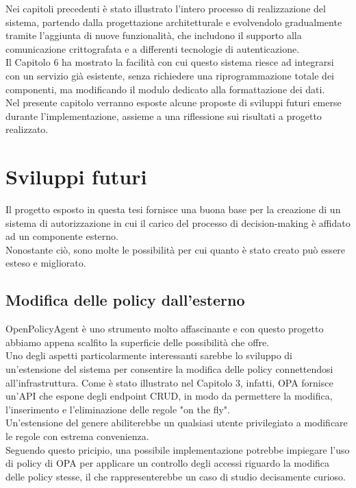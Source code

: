 Nei capitoli precedenti è stato illustrato l'intero processo di realizzazione del sistema, partendo dalla
progettazione architetturale e evolvendolo gradualmente tramite l'aggiunta di nuove funzionalità, che includono il supporto alla comunicazione crittografata 
e a differenti tecnologie di autenticazione. 
\\ Il Capitolo 6 ha mostrato la facilità 
con cui questo sistema riesce ad integrarsi con un servizio già esistente, senza richiedere una 
riprogrammazione totale dei componenti, ma modificando il modulo dedicato alla formattazione dei dati. 
\\ Nel presente capitolo verranno esposte alcune proposte di sviluppi futuri emerse durante l'implementazione, assieme a una riflessione
 sui risultati a progetto realizzato. 

\section{Sviluppi futuri}
Il progetto esposto in questa tesi fornisce una buona base per la creazione di un sistema di autorizzazione 
in cui il carico del processo di decision-making è affidato ad un componente esterno.  
\\ Nonostante ciò, sono molte le possibilità per cui quanto è stato creato può essere esteso e migliorato. 

\subsection{Modifica delle policy dall'esterno}
OpenPolicyAgent è uno strumento molto affascinante e con questo progetto abbiamo 
appena scalfito la superficie delle possibilità che offre. \\ Uno degli aspetti particolarmente interessanti 
sarebbe lo sviluppo di un'estensione del sistema per consentire la modifica delle policy connettendosi all'infrastruttura. 
Come è stato illustrato nel Capitolo 3, infatti, OPA fornisce un'API che espone degli 
endpoint CRUD, in modo da permettere la modifica, l'inserimento e l'eliminazione delle regole "on the fly".
\\Un'estensione del genere abiliterebbe un qualsiasi utente privilegiato a modificare le regole con estrema
 convenienza.   
\\ Seguendo questo pricipio, una possibile implementazione potrebbe impiegare l'uso di policy di OPA per applicare un controllo degli accessi 
riguardo la modifica delle policy stesse, il che rappresenterebbe un caso di studio decisamente curioso. 

